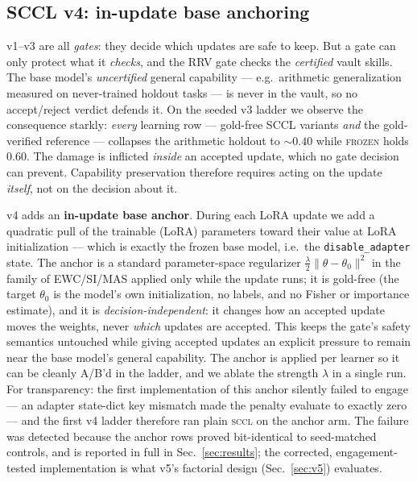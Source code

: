 \documentclass[10pt,conference]{IEEEtran}
\begin{document}
\subsection{SCCL v4: in-update base anchoring}
\label{sec:v4}
v1--v3 are all \emph{gates}: they decide which updates are safe to keep. But a gate can only protect what it \emph{checks}, and the RRV gate checks the \emph{certified} vault skills. The base model's \emph{uncertified} general capability --- e.g.\ arithmetic generalization measured on never-trained holdout tasks --- is never in the vault, so no accept/reject verdict defends it. On the seeded v3 ladder we observe the consequence starkly: \emph{every} learning row --- gold-free SCCL variants \emph{and} the gold-verified reference --- collapses the arithmetic holdout to $\sim\!0.40$ while \textsc{frozen} holds $0.60$. The damage is inflicted \emph{inside} an accepted update, which no gate decision can prevent. Capability preservation therefore requires acting on the update \emph{itself}, not on the decision about it.

v4 adds an \textbf{in-update base anchor}. During each LoRA update we add a quadratic pull of the trainable (LoRA) parameters toward their value at LoRA initialization --- which is exactly the frozen base model, i.e.\ the \texttt{disable\_adapter} state. The anchor is a standard parameter-space regularizer $\tfrac{\lambda}{2}\lVert\theta-\theta_0\rVert^2$ in the family of EWC/SI/MAS \cite{kirkpatrick2017ewc,si,mas} applied only while the update runs; it is gold-free (the target $\theta_0$ is the model's own initialization, no labels, and no Fisher or importance estimate), and it is \emph{decision-independent}: it changes how an accepted update moves the weights, never \emph{which} updates are accepted. This keeps the gate's safety semantics untouched while giving accepted updates an explicit pressure to remain near the base model's general capability. The anchor is applied per learner so it can be cleanly A/B'd in the ladder, and we ablate the strength $\lambda$ in a single run. For transparency: the first implementation of this anchor silently failed to engage --- an adapter state-dict key mismatch made the penalty evaluate to exactly zero --- and the first v4 ladder therefore ran plain \textsc{sccl} on the anchor arm. The failure was detected because the anchor rows proved bit-identical to seed-matched controls, and is reported in full in Sec.~\ref{sec:results}; the corrected, engagement-tested implementation is what v5's factorial design (Sec.~\ref{sec:v5}) evaluates.
\end{document}
